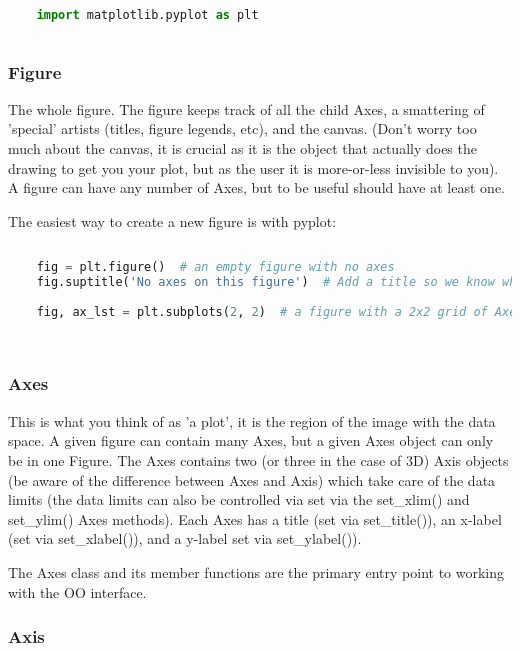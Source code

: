 \begin{lstlisting}[language=Python]
	
	import matplotlib.pyplot as plt
	
\end{lstlisting}

\subsubsection{Figure}

The whole figure. The figure keeps track of all the child Axes, a smattering of 'special' artists (titles, figure legends, etc), and the canvas. (Don't worry too much about the canvas, it is crucial as it is the object that actually does the drawing to get you your plot, but as the user it is more-or-less invisible to you). A figure can have any number of Axes, but to be useful should have at least one.

The easiest way to create a new figure is with pyplot:

\begin{lstlisting}[language=Python]
	
	fig = plt.figure()  # an empty figure with no axes
	fig.suptitle('No axes on this figure')  # Add a title so we know which it is
	
	fig, ax_lst = plt.subplots(2, 2)  # a figure with a 2x2 grid of Axes
	
	
\end{lstlisting}



\subsubsection{Axes}

This is what you think of as 'a plot', it is the region of the image with the data space. A given figure can contain many Axes, but a given Axes object can only be in one Figure. The Axes contains two (or three in the case of 3D) Axis objects (be aware of the difference between Axes and Axis) which take care of the data limits (the data limits can also be controlled via set via the set\_xlim() and set\_ylim() Axes methods). Each Axes has a title (set via set\_title()), an x-label (set via set\_xlabel()), and a y-label set via set\_ylabel()).

The Axes class and its member functions are the primary entry point to working with the OO interface.

\subsubsection{Axis}

